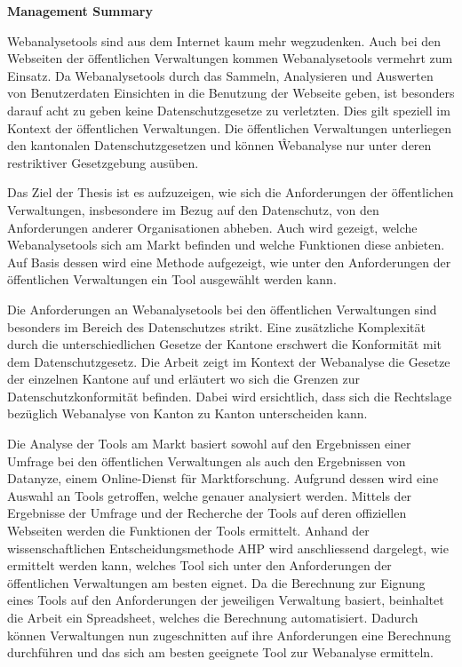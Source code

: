 \thispagestyle{plain}
\begin{center}
    \Large
    \textbf{}
    
    \vspace{0.4cm}
    \large
    

    \vspace{0.4cm}
    \textbf{}

    \vspace{0.4cm}
    \textbf{Management Summary}

\end{center}
Webanalysetools sind aus dem Internet kaum mehr wegzudenken. Auch bei den Webseiten der öffentlichen Verwaltungen kommen Webanalysetools vermehrt zum Einsatz. Da Webanalysetools durch das Sammeln, Analysieren und Auswerten von Benutzerdaten Einsichten in die Benutzung der Webseite geben, ist besonders darauf acht zu geben keine Datenschutzgesetze zu verletzten. Dies gilt speziell im Kontext der öffentlichen Verwaltungen. Die öffentlichen Verwaltungen unterliegen den kantonalen Datenschutzgesetzen und können Ŵebanalyse nur unter deren restriktiver Gesetzgebung ausüben.

Das Ziel der Thesis ist es aufzuzeigen, wie sich die Anforderungen der öffentlichen Verwaltungen, insbesondere im Bezug auf den Datenschutz, von den Anforderungen anderer Organisationen abheben. Auch wird gezeigt, welche Webanalysetools sich am Markt befinden und welche Funktionen diese anbieten. Auf Basis dessen wird eine Methode aufgezeigt, wie unter den Anforderungen der öffentlichen Verwaltungen ein Tool ausgewählt werden kann.

Die Anforderungen an Webanalysetools bei den öffentlichen Verwaltungen sind besonders im Bereich des Datenschutzes strikt. Eine zusätzliche Komplexität durch die unterschiedlichen Gesetze der Kantone erschwert die Konformität mit dem Datenschutzgesetz. Die Arbeit zeigt im Kontext der Webanalyse die Gesetze der einzelnen Kantone auf und erläutert wo sich die Grenzen zur Datenschutzkonformität befinden. Dabei wird ersichtlich, dass sich die Rechtslage bezüglich Webanalyse von Kanton zu Kanton unterscheiden kann.

Die Analyse der Tools am Markt basiert sowohl auf den Ergebnissen einer Umfrage bei den öffentlichen Verwaltungen als auch den Ergebnissen von Datanyze, einem Online-Dienst für Marktforschung. Aufgrund dessen wird eine Auswahl an Tools getroffen, welche genauer analysiert werden. Mittels der Ergebnisse der Umfrage und der Recherche der Tools auf deren offiziellen Webseiten werden die Funktionen der Tools ermittelt. Anhand der wissenschaftlichen Entscheidungsmethode AHP wird anschliessend dargelegt, wie ermittelt werden kann, welches Tool sich unter den Anforderungen der öffentlichen Verwaltungen am besten eignet. Da die Berechnung zur Eignung eines Tools auf den Anforderungen der jeweiligen Verwaltung basiert, beinhaltet die Arbeit ein Spreadsheet, welches die Berechnung automatisiert. Dadurch können Verwaltungen nun zugeschnitten auf ihre Anforderungen eine Berechnung durchführen und das sich am besten geeignete Tool zur Webanalyse ermitteln.

